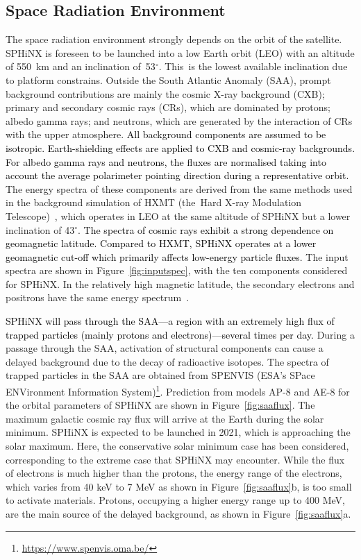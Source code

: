 \documentclass[galaxies,article,accept,moreauthors,pdftex,10pt,a4paper]{mdpi}
\begin{document}
\subsection{Space Radiation Environment}
The space radiation environment strongly depends on the orbit of the satellite. SPHiNX is foreseen to be launched into a low Earth orbit (LEO) with an altitude of 550~km and an inclination \mbox{of 53$^{\circ}$}. This~is the lowest available inclination due to platform constrains. Outside the South Atlantic Anomaly (SAA), prompt background contributions are mainly the cosmic X-ray background (CXB); primary and secondary cosmic rays (CRs), which are dominated by protons; albedo gamma rays; and neutrons, which are generated by the interaction of CRs with the upper atmosphere. %
\textcolor{black}{All background components are assumed to be isotropic. Earth-shielding effects are applied to CXB and cosmic-ray backgrounds. For albedo gamma rays and neutrons, the fluxes are normalised taking into account the average polarimeter pointing direction during a representative orbit.}
The energy spectra of these components are derived from the same methods used in the background simulation of HXMT (the~Hard X-ray Modulation Telescope)~\cite{ref:HXMT}, which operates in LEO at the same altitude of SPHiNX but a lower inclination of 43$^{\circ}$. \textcolor{black}{The spectra of cosmic rays exhibit a strong dependence on geomagnetic latitude. Compared to HXMT, SPHiNX operates at a lower geomagnetic cut-off which primarily affects low-energy particle fluxes.}
The input spectra are shown in Figure~\ref{fig:inputspec}, with the ten components considered for SPHiNX.  In the relatively high magnetic latitude, the secondary electrons and positrons have the same energy spectrum~\cite{ref:Mizuno}.

\textcolor{black}{SPHiNX will pass through the SAA---a region with an extremely high flux of trapped particles (mainly protons and electrons)---several times per day.}
During a passage through the SAA, activation of structural components can cause a delayed background due to the decay of radioactive isotopes.
The spectra of trapped particles in the SAA are obtained from SPENVIS (ESA's SPace ENVironment Information System)\footnote{\url{https://www.spenvis.oma.be/}}. Prediction from models AP-8 and AE-8 for the orbital parameters of SPHiNX are shown in Figure~\ref{fig:saaflux}. The maximum galactic cosmic ray flux will arrive at the Earth during the solar minimum. SPHiNX is expected to be launched in 2021, which is approaching the solar maximum. Here, the conservative solar minimum case has been considered, corresponding to the extreme case that SPHiNX may encounter.
While the flux of electrons is much higher than the protons, the energy range of the electrons, which varies from 40 keV to 7 MeV as shown in Figure~\ref{fig:saaflux}b, is too small to activate materials. Protons, occupying a higher energy range up to 400 MeV, are the main source of the delayed background, as shown in Figure~\ref{fig:saaflux}a.
\end{document}
